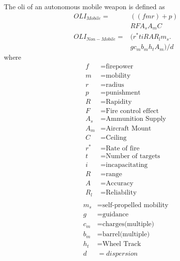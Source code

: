 \documentclass[]{article}
\begin{document}
    The \acrshort{oli} of an autonomous mobile weapon is defined as
\begin{equation}
\begin{split}
         OLI_{Mobile}=&((fmr)+p)\\&RFA_sA_mC\\   
        OLI_{Non-Mobile}=&(r^*tiRAR_lm_s.\\&gc_mb_mh_tA_m)/d
\end{split}
\end{equation}
     where
    \begin{align*}
     f&=\text{firepower}\\
     m&=\text{mobility}\\
     r&=\text{radius}\\
     p&=\text{punishment}\\
     R&=\text{Rapidity}\\
     F&=\text{Fire control effect}\\
     A_s&=\text{Ammunition Supply}\\
     A_m&=\text{Aircraft Mount}\\
     C&=\text{Ceiling}\\
     r^*&=\text{Rate of fire}\\
     t&=\text{Number of targets}\\
     i&=\text{incapacitating}\\
     R&=\text{range}\\
     A&=\text{Accuracy}\\
     R_l&=\text{Reliability}\\
    \end{align*}
    \begin{align*}
     m_s&=\text{self-propelled mobility}\\
     g&=\text{guidance}\\
     c_m&=\text{charges(multiple)}\\
     b_m&=\text{barrel(multiple)}\\
     h_t&=\text{Wheel Track}\\
     d&={dispersion}
    \end{align*}
   
\end{document}
